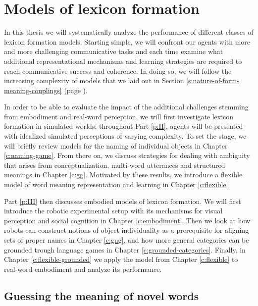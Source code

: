 \setcounter{chapter}{2}

\chapter{Models of lexicon formation}
\label{c:thesis-overview}

In this thesis we will systematically analyze the performance of
different classes of lexicon formation models. Starting simple, we
will confront our agents with more and more challenging communicative
tasks and each time examine what additional representational
mechanisms and learning strategies are required to reach communicative
success and coherence. In doing so, we will follow the increasing
complexity of models that we laid out in Section
\ref{s:nature-of-form-meaning-couplings} (page
\pageref{s:nature-of-form-meaning-couplings}).

In order to be able to evaluate the impact of the additional
challenges stemming from embodiment and real-word perception, we will
first investigate lexicon formation in simulated worlds: throughout
Part \ref{p:II}, agents will be presented with idealized simulated
perceptions of varying complexity. To set the stage, we will briefly
review models for the naming of individual objects in Chapter
\ref{c:naming-game}.  From there on, we discuss strategies for dealing
with ambiguity that arises from conceptualization, multi-word
utterances and structured meanings in Chapter \ref{c:gg}. Motivated by
these results, we introduce a flexible model of word meaning
representation and learning in Chapter \ref{c:flexible}. 

Part \ref{p:III} then discusses embodied models of lexicon
formation. We will first introduce the robotic experimental setup with
its mechanisms for visual perception and social cognition in Chapter
\ref{c:embodiment}. Then we look at how robots can construct notions
of object individuality as a prerequisite for aligning sets of proper
names in Chapter \ref{c:gng}, and how more general categories can be
grounded trough language games in Chapter
\ref{c:grounded-categories}. Finally, in Chapter
\ref{c:flexible-grounded} we apply the model from Chapter
\ref{c:flexible} to real-word embodiment and
analyze its performance.\\



\section{Guessing the meaning of novel words}

